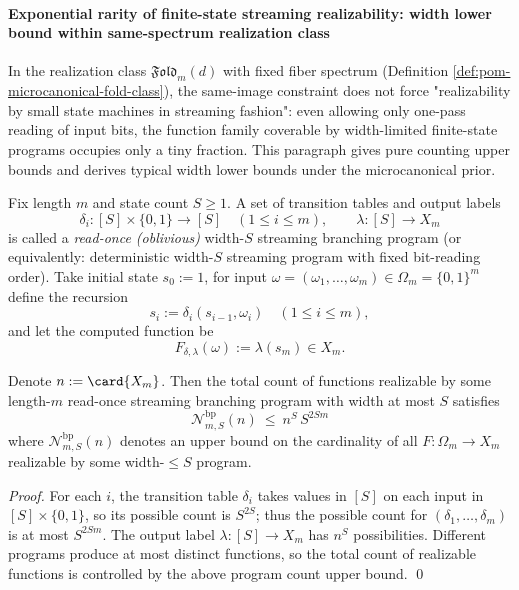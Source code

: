 \paragraph{Exponential rarity of finite-state streaming realizability: width lower bound within same-spectrum realization class}
In the realization class \(\mathfrak{Fold}_m(d)\) with fixed fiber spectrum (Definition \ref{def:pom-microcanonical-fold-class}),
the same-image constraint does not force "realizability by small state machines in streaming fashion":
even allowing only one-pass reading of input bits, the function family coverable by width-limited finite-state programs occupies only a tiny fraction.
This paragraph gives pure counting upper bounds and derives typical width lower bounds under the microcanonical prior.

\begin{definition}\label{def:pom-oblivious-widthS-branching-program}
Fix length \(m\) and state count \(S\ge 1\).
A set of transition tables and output labels
\[
\delta_i:[S]\times\{0,1\}\to [S]\quad(1\le i\le m),
\qquad
\lambda:[S]\to X_m
\]
is called a \emph{read-once (oblivious)} width-\(S\) streaming branching program (or equivalently: deterministic width-\(S\) streaming program with fixed bit-reading order).
Take initial state \(s_0:=1\), for input \(\omega=(\omega_1,\dots,\omega_m)\in\Omega_m=\{0,1\}^m\) define the recursion
\[
s_i:=\delta_i(s_{i-1},\omega_i)\quad(1\le i\le m),
\]
and let the computed function be
\[
F_{\delta,\lambda}(\omega):=\lambda(s_m)\in X_m.
\]
\end{definition}

\begin{theorem}\label{thm:pom-oblivious-widthS-branching-program-count}
Denote \(n:=\card{X_m}\).
Then the total count of functions realizable by some length-\(m\) read-once streaming branching program with width at most \(S\) satisfies
\[
\boxed{\;
\mathcal N^{\mathrm{bp}}_{m,S}(n)
\ \le\ n^{S}\,S^{2Sm}\;}
\]
where \(\mathcal N^{\mathrm{bp}}_{m,S}(n)\) denotes an upper bound on the cardinality of all \(F:\Omega_m\to X_m\) realizable by some width-\(\le S\) program.
\end{theorem}
\begin{proof}
For each \(i\), the transition table \(\delta_i\) takes values in \([S]\) on each input in \([S]\times\{0,1\}\), so its possible count is
\(
S^{2S}
\);
thus the possible count for \((\delta_1,\dots,\delta_m)\) is at most \(S^{2Sm}\).
The output label \(\lambda:[S]\to X_m\) has \(n^S\) possibilities.
Different programs produce at most distinct functions, so the total count of realizable functions is controlled by the above program count upper bound. \qed
\end{proof}

